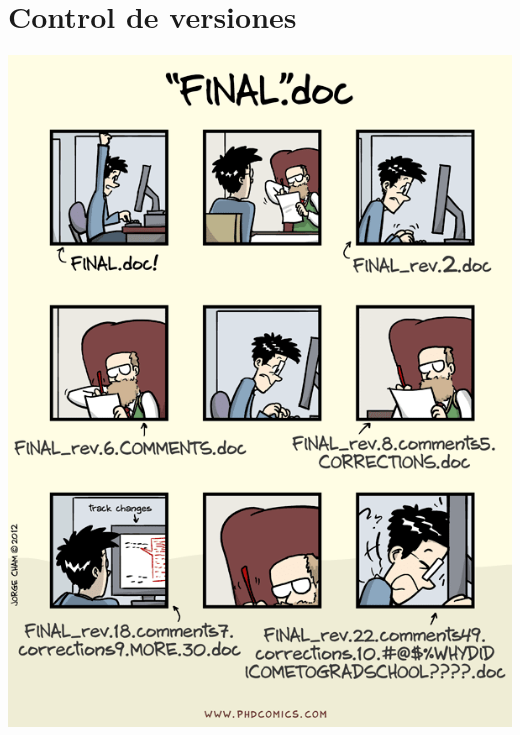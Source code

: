 \documentclass{beamer}
\begin{document}
\section{Control de versiones}
\begin{frame}
\centering
\includegraphics[scale=0.3]{Imagenes/Final_doc} 
\end{frame}
\end{document}
